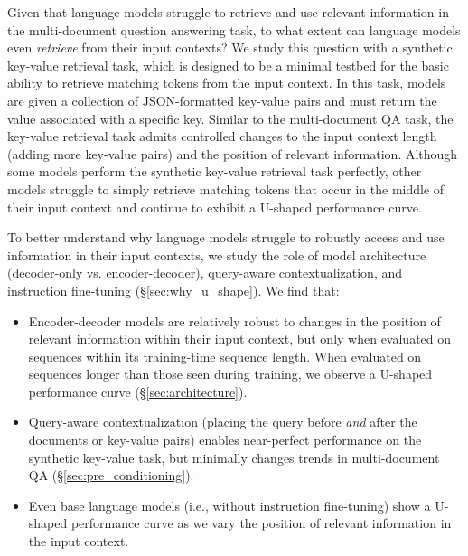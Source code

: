 Given that language models struggle to retrieve and use relevant information in the multi-document question answering task, to what extent can language models even \emph{retrieve} from their input contexts? We study this question with a synthetic key-value retrieval task, which is designed to be a minimal testbed for the basic ability to retrieve matching tokens from the input context. In this task, models are given a collection of JSON-formatted key-value pairs and must return the value associated with a specific key. Similar to the multi-document QA task, the key-value retrieval task admits controlled changes to the input context length (adding more key-value pairs) and the position of relevant information. Although some models perform the synthetic key-value retrieval task perfectly, other models struggle to simply retrieve matching tokens that occur in the middle of their input context and continue to exhibit a U-shaped performance curve.

To better understand why language models struggle to robustly access and use information in their input contexts, we study the role of model architecture (decoder-only vs. encoder-decoder), query-aware contextualization, and instruction fine-tuning (\S\ref{sec:why_u_shape}). We find that:

\begin{itemize}
\itemsep0em \item Encoder-decoder models are relatively robust to changes in the position of relevant information within their input context, but only when evaluated on sequences within its training-time sequence length. When evaluated on sequences longer than those seen during training, we observe a U-shaped performance curve (\S\ref{sec:architecture}).
\item Query-aware contextualization (placing the query before \emph{and} after the documents or key-value pairs) enables near-perfect performance on the synthetic key-value task, but minimally changes trends in multi-document QA (\S\ref{sec:pre_conditioning}).
\item Even base language models (i.e., without instruction fine-tuning) show a U-shaped performance curve as we vary the position of relevant information in the input context.
\end{itemize}

